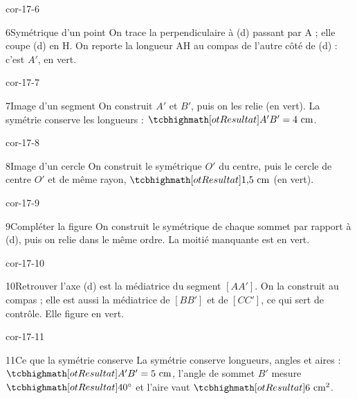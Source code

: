 \begin{blocLivre}{cor-17-6}\begin{corrige}{6}{Symétrique d’un point}
On trace la perpendiculaire à (d) passant par A ; elle coupe (d) en H. On reporte la longueur AH au compas de l’autre côté de (d) : c’est $A'$, en vert.
\label{fig-cor-17-6}
\end{corrige}\end{blocLivre}
\begin{blocLivre}{cor-17-7}\begin{corrige}{7}{Image d’un segment}
On construit $A'$ et $B'$, puis on les relie (en vert). La symétrie conserve les longueurs : $\res{A'B'=4\ \mathrm{cm}}$.
\label{fig-cor-17-7}
\end{corrige}\end{blocLivre}
\begin{blocLivre}{cor-17-8}\begin{corrige}{8}{Image d’un cercle}
On construit le symétrique $O'$ du centre, puis le cercle de centre $O'$ et de même rayon, $\res{1{,}5\ \mathrm{cm}}$ (en vert).
\label{fig-cor-17-8}
\end{corrige}\end{blocLivre}
\begin{blocLivre}{cor-17-9}\begin{corrige}{9}{Compléter la figure}
On construit le symétrique de chaque sommet par rapport à (d), puis on relie dans le même ordre. La moitié manquante est en vert.
\label{fig-cor-17-9}
\end{corrige}\end{blocLivre}
\begin{blocLivre}{cor-17-10}\begin{corrige}{10}{Retrouver l’axe}
(d) est la médiatrice du segment $[AA']$. On la construit au compas ; elle est aussi la médiatrice de $[BB']$ et de $[CC']$, ce qui sert de contrôle. Elle figure en vert.
\label{fig-cor-17-10}
\end{corrige}\end{blocLivre}
\begin{blocLivre}{cor-17-11}\begin{corrige}{11}{Ce que la symétrie conserve}
La symétrie conserve longueurs, angles et aires : $\res{A'B'=5\ \mathrm{cm}}$, l’angle de sommet $B'$ mesure $\res{40^\circ}$ et l’aire vaut $\res{6\ \mathrm{cm}^2}$.
\label{fig-cor-17-11}
\end{corrige}\end{blocLivre}
